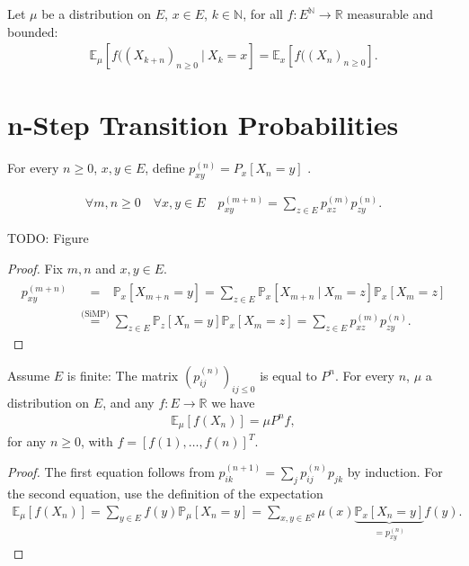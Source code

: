 \begin{cor}
Let $\mu$ be a  distribution on $E$, $x \in E$, $k \in \mathbb{N}$, for all $f: E^{\mathbb{N}} \to \mathbb{R}$ measurable and bounded:
\begin{align}
	\boxed{	\mathbb{E}_\mu \left[ f((X_{k+n})_{n \geq 0} \ | \ X_k =x \right] = \mathbb{E} _x \left[ f((X_n)_{n \geq 0} \right] .}  
\end{align}
\end{cor}

\noindent
\section{n-Step Transition Probabilities}
\begin{defn}
	For every $n\geq0$, $x, y \in E$, define $p_{xy}^{(n)}=P_x[X_n=y]$
.\end{defn}

\begin{prop}
\begin{align}
	\forall m,n \geq 0 \quad \forall x,y \in E \quad \boxed{ p_{xy}^{(m+n)}= \sum_{z \in E} p_{xz}^{(m)}p_{zy}^{(n)}.}
\end{align}
\end{prop}
{\color{blue} TODO: Figure}
\begin{proof}
Fix $m,n$ and $x,y \in E$.
	\begin{align}
		p_{xy}^{(m+n)} &\stackrel{\phantom{\textrm{(SiMP)}}}{=} 
			\mathbb{P}_{x} \left[ X_{m+n}=y \right] =
			\sum_{z \in E}^{} \mathbb{P}_{x} \left[ X_{m+n} \ | \ X_m = z \right] \mathbb{P}_{x} \left[ X_m = z \right] \\
		&\stackrel{\textrm{(SiMP)}}{=} \sum_{z \in E}^{} \mathbb{P}_{z} \left[ X_n=y \right] \mathbb{P}_{x} \left[ X_m=z \right] = \sum_{z \in E}^{} p_{xz}^{(m)} p_{zy}^{(n)}  	
	.\end{align}
	
\end{proof}


\begin{prop}[]
	Assume $E$ is finite:
The matrix $(p_{ij}^{(n)})_{ij \leq 0}$ is equal to $P^n$. For every $n$, $\mu$ a distribution on $E$, and any $f:E \to \mathbb{R}$ we have
	\begin{align}
	\mathbb{E}_{\mu} \left[ f(X_n) \right] = \mu P^n f
,\end{align}
for any $n\geq 0$, with $f = [f(1), \ldots ,f(n)]^T$.
\end{prop}
\begin{proof}
	The first equation follows from $p_{ik}^{(n+1)}= \sum_{j}^{} p_{ij}^{(n)}p_{jk}$ by induction. For the second equation, use the definition of the expectation
\begin{align}
	\mathbb{E}_{\mu } \left[ f(X_n) \right]  = \sum_{y \in E}^{}  f(y) \mathbb{P}_{\mu } \left[ X_n = y \right] = \sum_{x,y \in E^2}^{}  \mu (x) \underbrace{\mathbb{P}_{x} \left[ X_n =y \right]}_{=p_{xy}^{(n)}} f(y).
\end{align}
\end{proof}


